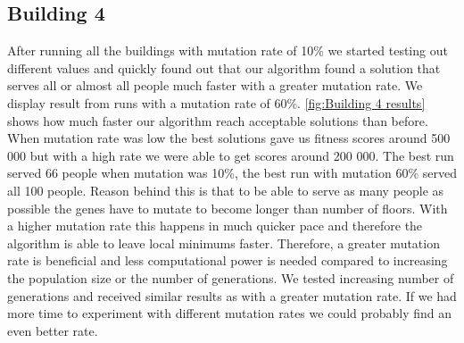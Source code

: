 \subsection{Building 4}
After running all the buildings with mutation rate of 10\% we started testing out different values and quickly found out that our algorithm found a solution that serves all or almost all people much faster with a greater mutation rate. We display result from runs with a mutation rate of 60\%. \ref{fig:Building 4 results} shows how much faster our algorithm reach acceptable solutions than before. When mutation rate was low the best solutions gave us fitness scores around 500 000 but with a high rate we were able to get scores around 200 000. The best run served 66 people when mutation was 10\%, the best run with mutation 60\% served all 100 people. Reason behind this is that to be able to serve as many people as possible the genes have to mutate to become longer than number of floors. With a higher mutation rate this happens in much quicker pace and therefore the algorithm is able to leave local minimums faster. Therefore, a greater mutation rate is beneficial and less computational power is needed compared to increasing the population size or the number of generations. We tested increasing number of generations and received similar results as with a greater mutation rate. If we had more time to experiment with different mutation rates we could probably find an even better rate.

